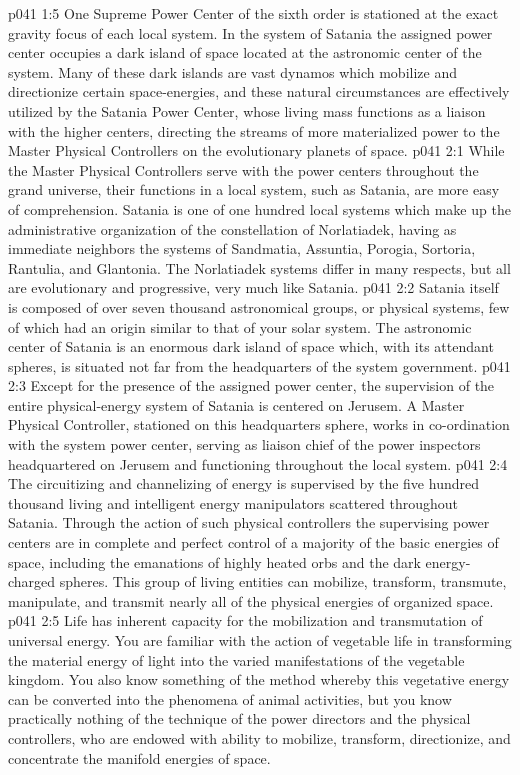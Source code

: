 \vs p041 1:5 One Supreme Power Center of the sixth order is stationed at the exact gravity focus of each local system. In the system of Satania the assigned power center occupies a dark island of space located at the astronomic center of the system. Many of these dark islands are vast dynamos which mobilize and directionize certain space\hyp{}energies, and these natural circumstances are effectively utilized by the Satania Power Center, whose living mass functions as a liaison with the higher centers, directing the streams of more materialized power to the Master Physical Controllers on the evolutionary planets of space.
\vs p041 2:1 While the Master Physical Controllers serve with the power centers throughout the grand universe, their functions in a local system, such as Satania, are more easy of comprehension. Satania is one of one hundred local systems which make up the administrative organization of the constellation of Norlatiadek, having as immediate neighbors the systems of Sandmatia, Assuntia, Porogia, Sortoria, Rantulia, and Glantonia. The Norlatiadek systems differ in many respects, but all are evolutionary and progressive, very much like Satania.
\vs p041 2:2 Satania itself is composed of over seven thousand astronomical groups, or physical systems, few of which had an origin similar to that of your solar system. The astronomic center of Satania is an enormous dark island of space which, with its attendant spheres, is situated not far from the headquarters of the system government.
\pc \vs p041 2:3 Except for the presence of the assigned power center, the supervision of the entire physical\hyp{}energy system of Satania is centered on Jerusem. A Master Physical Controller, stationed on this headquarters sphere, works in co\hyp{}ordination with the system power center, serving as liaison chief of the power inspectors headquartered on Jerusem and functioning throughout the local system.
\vs p041 2:4 The circuitizing and channelizing of energy is supervised by the five hundred thousand living and intelligent energy manipulators scattered throughout Satania. Through the action of such physical controllers the supervising power centers are in complete and perfect control of a majority of the basic energies of space, including the emanations of highly heated orbs and the dark energy\hyp{}charged spheres. This group of living entities can mobilize, transform, transmute, manipulate, and transmit nearly all of the physical energies of organized space.\plusone
\vs p041 2:5 Life has inherent capacity for the mobilization and transmutation of universal energy. You are familiar with the action of vegetable life in transforming the material energy of light into the varied manifestations of the vegetable kingdom. You also know something of the method whereby this vegetative energy can be converted into the phenomena of animal activities, but you know practically nothing of the technique of the power directors and the physical controllers, who are endowed with ability to mobilize, transform, directionize, and concentrate the manifold energies of space.
